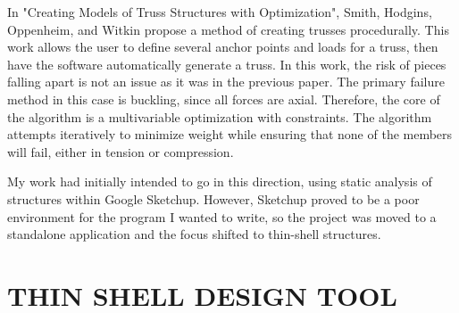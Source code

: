 \documentclass{thesis}
\begin{document}
In "Creating Models of Truss Structures with Optimization"\cite{Carnegie02creatingmodels}, Smith, Hodgins, Oppenheim, and Witkin propose
a method of creating trusses procedurally.  This work allows the user to define several anchor points
and loads for a truss, then have the software automatically generate a truss.  In this work, the risk
of pieces falling apart is not an issue as it was in the previous paper.  The primary failure method
in this case is buckling, since all forces are axial.  Therefore, the core of the algorithm is a
multivariable optimization with constraints.  The algorithm attempts iteratively to minimize weight
while ensuring that none of the members will fail, either in tension or compression.

My work had initially intended to go in this direction, using static analysis of structures within
Google Sketchup.  However, Sketchup proved to be a poor environment for the program I wanted to write, so
the project was moved to a standalone application and the focus shifted to thin-shell structures.

\chapter{THIN SHELL DESIGN TOOL}
\end{document}
